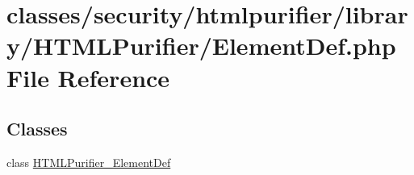 \hypertarget{ElementDef_8php}{\section{classes/security/htmlpurifier/library/\+H\+T\+M\+L\+Purifier/\+Element\+Def.php File Reference}
\label{ElementDef_8php}
}
\subsection*{Classes}
\begin{DoxyCompactItemize}
\item 
class \hyperlink{classHTMLPurifier__ElementDef}{H\+T\+M\+L\+Purifier\+\_\+\+Element\+Def}
\end{DoxyCompactItemize}

